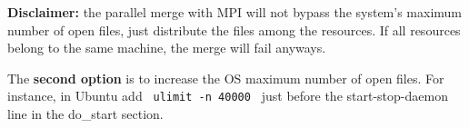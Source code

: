 \textbf{Disclaimer:} the parallel merge with MPI will not bypass the system's maximum number of open files, just distribute the files among the resources. If all resources belong to the same machine, the merge will fail anyways.

\hfill

The \textbf{second option} is to increase the OS maximum number of open files. For instance, in Ubuntu add \texttt{ ulimit -n 40000 } just before the start-stop-daemon line in the do\_start section.





